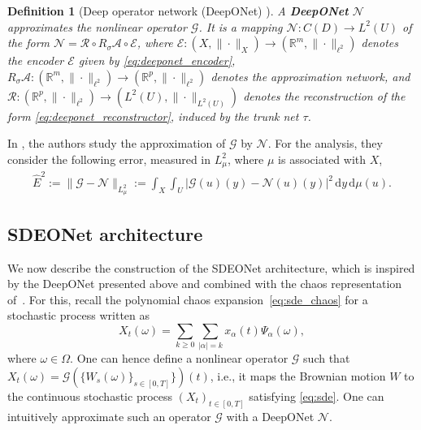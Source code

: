 \documentclass[12pt]{article}
\newtheorem{definition}[theorem]{Definition}
\theoremstyle{remark}
\theoremstyle{plain}
\numberwithin{equation}{section}
\newcommand{\dd}{\ensuremath{\,\mathrm d}}
\newcommand{\R}{\mathbb{R}}
\newcommand{\charles}[1]{\textcolor{CharlesColor}{#1}}
\begin{document}
\begin{definition}[{Deep operator network (DeepONet) \cite[Definitions~2.1 \& 2.4]{lanthalerErrorEstimatesDeepONets2022}}]
    A \textbf{DeepONet} $\mathcal N$ approximates the nonlinear operator $\mathcal G$.
    It is a mapping $\mathcal N : C(D) \to L^2(U)$ of the form $\mathcal N = \mathcal R \circ R_\sigma \mathcal A \circ \mathcal E$, where $\mathcal E : (X, \|\cdot\|_X) \to (\R^m, \|\cdot\|_{\ell^2})$ denotes the encoder $\mathcal E$ given by \cref{eq:deeponet_encoder}, $R_\sigma \mathcal A : (\R^m, \|\cdot\|_{\ell^2}) \to (\R^p, \|\cdot\|_{\ell^2})$ denotes the approximation network, and $\mathcal R : (\R^p, \|\cdot\|_{\ell^2}) \to (L^2(U), \|\cdot\|_{L^2(U)})$ denotes the reconstruction of the form \cref{eq:deeponet_reconstructor}, induced by the trunk net $\tau$.
\end{definition}

In \cite{lanthalerErrorEstimatesDeepONets2022}, the authors study the approximation of $\mathcal G$ by $\mathcal N$.
For the analysis, they consider the following error, measured in $L_\mu^2$, where $\mu$ is associated with $X$,
\begin{equation}
\label{eq:deeponet_error}
    \begin{aligned}
        \hat E^2 := \|\mathcal G - \mathcal N\|_{L_\mu^2}
        := \int_X \int_U |\mathcal G(u)(y) - \mathcal N(u)(y)|^2 \dd y \dd\mu(u).
    \end{aligned}
\end{equation}




\subsection{SDEONet architecture}
\label{sec:sdeonet}

We now describe the construction of the SDEONet architecture, which is inspired by the DeepONet presented above and combined with the chaos representation of~.
For this, recall the polynomial chaos expansion~\cref{eq:sde_chaos} for a stochastic process written as
\begin{equation}
    X_t(\omega) = \sum_{k \geq 0}\sum_{|\alpha|=k} x_\alpha(t) \Psi_\alpha(\omega), \label{eq:sde_params}
\end{equation}
where $\omega \in \Omega$.
One can hence define a nonlinear operator $\mathcal G$ such that $X_t(\omega) = \mathcal G(\{W_s(\omega)\}_{s \in [0,T]}\})(t)$, i.e., it maps the Brownian motion $W$ to the continuous stochastic process $(X_t)_{t \in [0,T]}$ satisfying \cref{eq:sde}.
One can intuitively approximate such an operator $\mathcal G$ with a DeepONet $\mathcal N$.
\end{document}
